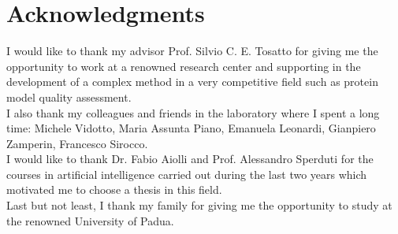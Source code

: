 

\chapter*{Acknowledgments}

I would like to thank my advisor Prof. Silvio C. E. Tosatto for giving me the opportunity to work at a renowned research center and supporting in the development of a complex method in a very competitive field such as protein model quality assessment. \\
I also thank my colleagues and friends in the laboratory where I spent a long time: Michele Vidotto, Maria Assunta Piano, Emanuela Leonardi, Gianpiero Zamperin, Francesco Sirocco.\\
I would like to thank Dr. Fabio Aiolli and Prof. Alessandro Sperduti for the courses in artificial intelligence carried out during the last two years which motivated me to choose a thesis in this field.\\
Last but not least, I thank my family for giving me the opportunity to study at the renowned University of Padua.